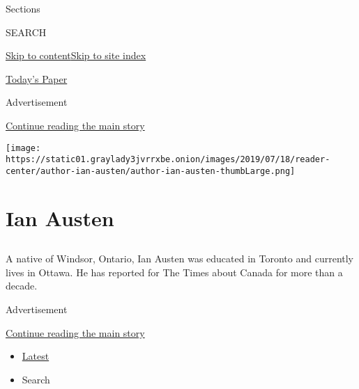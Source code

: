 Sections

SEARCH

\protect\hyperlink{site-content}{Skip to
content}\protect\hyperlink{site-index}{Skip to site index}

\href{https://myaccount.nytimes3xbfgragh.onion/auth/login?response_type=cookie\&client_id=vi}{}

\href{https://www.nytimes3xbfgragh.onion/section/todayspaper}{Today's
Paper}

Advertisement

\protect\hyperlink{after-top}{Continue reading the main story}

\texttt{[image: https://static01.graylady3jvrrxbe.onion/images/2019/07/18/reader-center/author-ian-austen/author-ian-austen-thumbLarge.png]}

\hypertarget{ian-austen}{%
\section{Ian Austen}\label{ian-austen}}

\subsection{}

A native of Windsor, Ontario, Ian Austen was educated in Toronto and
currently lives in Ottawa. He has reported for The Times about Canada
for more than a decade.

Advertisement

\protect\hyperlink{after-mid1}{Continue reading the main story}

\begin{itemize}
\tightlist
\item
  \protect\hyperlink{stream-panel}{Latest}
\item
  Search
\end{itemize}

